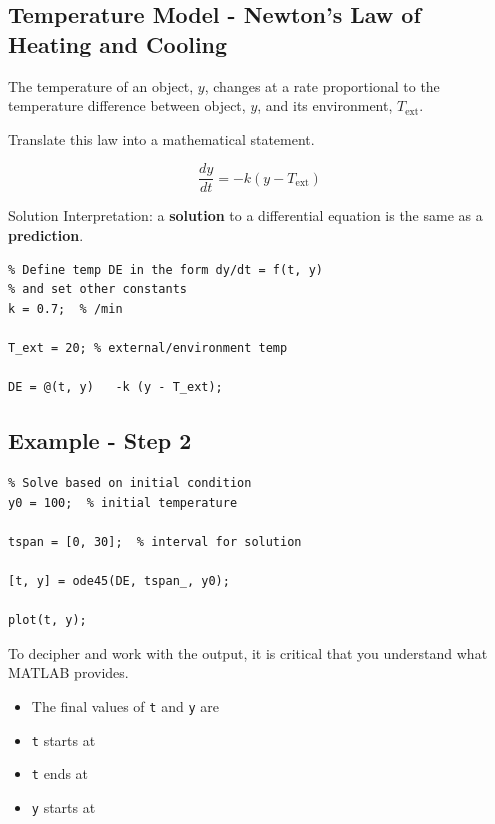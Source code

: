 \newpage

\subsection*{Temperature Model - Newton's Law of Heating and Cooling}

The temperature of an object, $y$, changes at a rate proportional to
the temperature difference between object, $y$, and its environment,
$T_{\mbox{ext}}$.

\problem Translate this law into a mathematical statement.

\newpage

$$\frac{dy}{dt} = -k (y - T_{\mbox{ext}})$$

Solution Interpretation: a {\bf solution} to a differential equation
is the same as a {\bf prediction}.

\begin{verbatim}
% Define temp DE in the form dy/dt = f(t, y)
% and set other constants
k = 0.7;  % /min

T_ext = 20; % external/environment temp

DE = @(t, y)   -k (y - T_ext);

\end{verbatim}

\newpage

\subsection*{Example - Step 2}
\begin{verbatim}
% Solve based on initial condition
y0 = 100;  % initial temperature

tspan = [0, 30];  % interval for solution

[t, y] = ode45(DE, tspan_, y0);

plot(t, y);
\end{verbatim}

\newpage

To decipher and work with the output, it is critical that you
understand what MATLAB provides.  
\begin{itemize}
\item The final values of \verb#t# and \verb#y# are 
\vfill
\item \verb#t# starts at
\vfill
\item \verb#t# ends at
\vfill
\item \verb#y# starts at
\vfill
\end{itemize}

